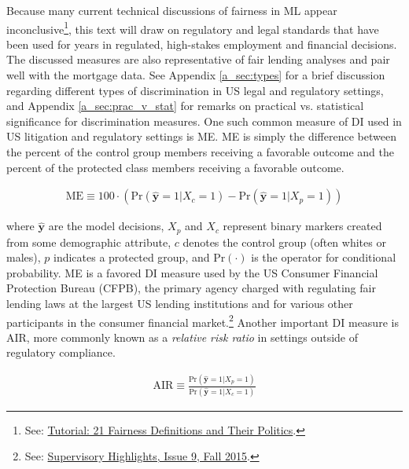 \documentclass[information,article,submit,moreauthors,pdftex]{definitions/mdpi}
\begin{document}
Because many current technical discussions of fairness in ML appear inconclusive\footnote{See: \href{https://www.youtube.com/watch?v=jIXIuYdnyyk}{Tutorial: 21 Fairness Definitions and Their Politics}.}, this text will draw on regulatory and legal standards that have been used for years in regulated, high-stakes employment and financial decisions. The discussed measures are also representative of fair lending analyses and pair well with the mortgage data. See Appendix \ref{a_sec:types} for a brief discussion regarding different types of discrimination in US legal and regulatory settings, and Appendix \ref{a_sec:prac_v_stat} for remarks on practical vs. statistical significance for discrimination measures. One such common measure of DI used in US litigation and regulatory settings is ME. ME is simply the difference between the percent of the control group members receiving a favorable outcome and the percent of the protected class members receiving a favorable outcome. 

\begin{equation}
\label{eq:me}
\begin{aligned}
\text{ME} \equiv 100 \cdot (\text{Pr}(\hat{\mathbf{y}} = 1| X_c = 1)  - \text{Pr}(\hat{\mathbf{y}} = 1 | X_p = 1))
\end{aligned}
\end{equation}

\noindent where $\hat{\mathbf{y}}$ are the model decisions, $X_p$ and $X_c$ represent binary markers created from some demographic attribute, $c$ denotes the control group (often whites or males), $p$ indicates a protected group, and $\text{Pr}(\cdot)$ is the operator for conditional probability.  ME is a favored DI measure used by the US Consumer Financial Protection Bureau (CFPB), the primary agency charged with regulating fair lending laws at the largest US lending institutions and for various other participants in the consumer financial market.\footnote{See: \href{https://files.consumerfinance.gov/f/201510_cfpb_supervisory-highlights.pdf}{Supervisory Highlights, Issue 9, Fall 2015}.} Another important DI measure is AIR, more commonly known as a \textit{relative risk ratio} in settings outside of regulatory compliance.

\begin{equation}
\label{eq:air}
\begin{aligned}
\text{AIR} \equiv \frac{\text{Pr}(\hat{\mathbf{y}} = 1 | X_p = 1)}{\text{Pr}(\hat{\mathbf{y}} = 1| X_c = 1)}
\end{aligned}
\end{equation}
\end{document}

